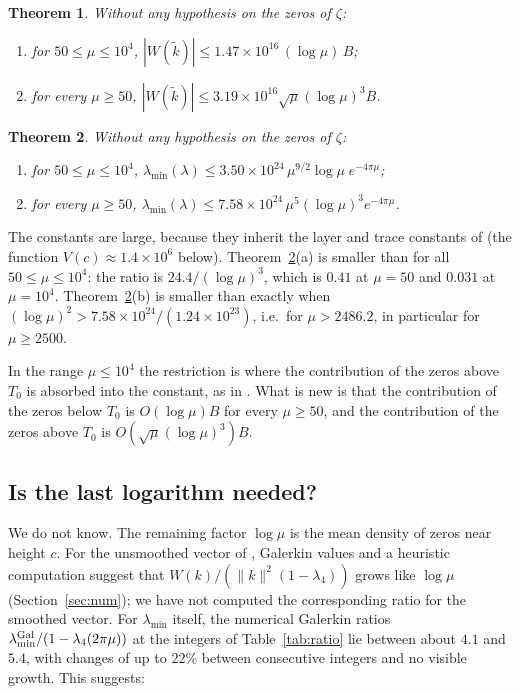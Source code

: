 \documentclass[11pt]{amsart}
\newtheorem{theorem}{Theorem}
\theoremstyle{remark}
\numberwithin{equation}{section}
\begin{document}
\begin{theorem}\label{thm:J}
Without any hypothesis on the zeros of $\zeta$:
\begin{enumerate}
\item[(a)] for $50\le\mu\le10^4$, $|W(\tilde k)|\le1.47\times10^{16}\,(\log\mu)\,B$;
\item[(b)] for every $\mu\ge50$, $|W(\tilde k)|\le3.19\times10^{16}\sqrt\mu(\log\mu)^3B$.
\end{enumerate}
\end{theorem}

\begin{theorem}\label{thm:K}
Without any hypothesis on the zeros of $\zeta$:
\begin{enumerate}
\item[(a)] for $50\le\mu\le10^4$, $\lambda_{\min}(\lambda)\le3.50\times10^{24}\,\mu^{9/2}\log\mu\;e^{-4\pi\mu}$;
\item[(b)] for every $\mu\ge50$, $\lambda_{\min}(\lambda)\le7.58\times10^{24}\,\mu^5(\log\mu)^3e^{-4\pi\mu}$.
\end{enumerate}
\end{theorem}

The constants are large, because they inherit the layer and trace constants of \cite{MoriWeilIII} (the function $V(c)\approx1.4\times10^6$ below). Theorem~\ref{thm:K}(a) is smaller than \cite[Thm.~G(a)]{MoriWeilIII} for all $50\le\mu\le10^4$: the ratio is $24.4/(\log\mu)^3$, which is $0.41$ at $\mu=50$ and $0.031$ at $\mu=10^4$. Theorem~\ref{thm:K}(b) is smaller than \cite[Thm.~G(b)]{MoriWeilIII} exactly when $(\log\mu)^2>7.58\times10^{24}/(1.24\times10^{23})$, i.e.\ for $\mu>2486.2$, in particular for $\mu\ge2500$.

In the range $\mu\le10^4$ the restriction is where the contribution of the zeros above $T_0$ is absorbed into the constant, as in \cite{MoriWeilIII}. What is new is that the contribution of the zeros below $T_0$ is $O(\log\mu)B$ for every $\mu\ge50$, and the contribution of the zeros above $T_0$ is $O(\sqrt\mu(\log\mu)^3)B$.

\subsection{Is the last logarithm needed?}
We do not know. The remaining factor $\log\mu$ is the mean density of zeros near height $c$. For the unsmoothed vector of \cite{MoriWeilII}, Galerkin values and a heuristic computation suggest that $W(k)/(\|k\|^2(1-\lambda_4))$ grows like $\log\mu$ (Section~\ref{sec:num}); we have not computed the corresponding ratio for the smoothed vector. For $\lambda_{\min}$ itself, the numerical Galerkin ratios $\lambda_{\min}^{\rm Gal}/(1-\lambda_4(2\pi\mu))$ at the integers of Table~\ref{tab:ratio} lie between about $4.1$ and $5.4$, with changes of up to $22\%$ between consecutive integers and no visible growth. This suggests:
\end{document}
